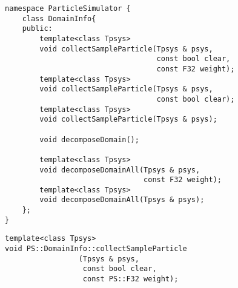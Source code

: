 \begin{lstlisting}[caption=DomainInfo2]
namespace ParticleSimulator {
    class DomainInfo{
    public:
        template<class Tpsys>
        void collectSampleParticle(Tpsys & psys,
                                   const bool clear,
                                   const F32 weight);
        template<class Tpsys>
        void collectSampleParticle(Tpsys & psys,
                                   const bool clear);
        template<class Tpsys>
        void collectSampleParticle(Tpsys & psys);
        
        void decomposeDomain();
        
        template<class Tpsys>
        void decomposeDomainAll(Tpsys & psys,
                                const F32 weight);
        template<class Tpsys>
        void decomposeDomainAll(Tpsys & psys);
    };
}
\end{lstlisting}


\begin{screen}
\begin{verbatim}
template<class Tpsys>
void PS::DomainInfo::collectSampleParticle
                 (Tpsys & psys,
                  const bool clear,
                  const PS::F32 weight);
\end{verbatim}
\end{screen}

